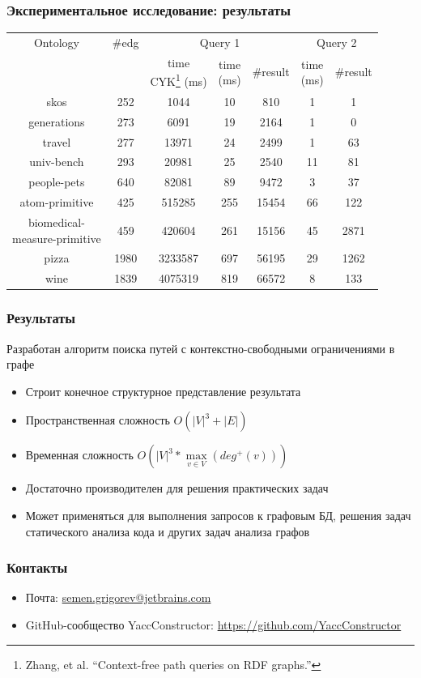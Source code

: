 \documentclass[xcolor=table]{beamer}
\begin{document}
\begin{frame}[fragile]
\transwipe[direction=90]
\frametitle{Экспериментальное исследование: результаты}
\centering
{}
\begin{tabular}{  c | c | c | c | c | c | c }
Ontology & \#edg & \multicolumn{3}{c|}{Query 1} & \multicolumn{2}{c}{Query 2} \\
\cline{3-7}
& & \shortstack{time \\ CYK\footnote{Zhang, et al. ``Context-free path queries on RDF graphs.''} (ms)} & \shortstack{time \\ (ms)} & \#result & \shortstack{time \\ (ms)} & \#result \\
\hline 
\hline
skos        & 252  & 1044  & 10 & 810 & 1 & 1 \\
generations & 273  & 6091  & 19 & 2164 & 1 & 0 \\
travel      & 277  & 13971 & 24 & 2499 & 1 & 63 \\
univ-bench  & 293  & 20981 & 25 & 2540 & 11 & 81 \\
people-pets & 640  & 82081 & 89 & 9472 & 3 & 37 \\
atom-primitive & 425 & 515285 & 255 & 15454 & 66 & 122 \\
\shortstack{biomedical- \\ measure-primitive} & 459 & 420604 & 261 & 15156 & 45 & 2871 \\
pizza       & 1980 & 3233587 & 697 & 56195 & 29 & 1262 \\
wine        & 1839 & 4075319 & 819 & 66572 & 8 & 133 \\
\end{tabular}

\end{frame}

\begin{frame}
  \transwipe[direction=90]
  \frametitle{Результаты}

Разработан алгоритм поиска путей с контекстно-свободными ограничениями в графе
\begin{itemize} 
\item Строит конечное структурное представление результата
\item Пространственная сложность $O(|V|^3 + |E|)$
\item Временная сложность $O\left(|V|^3*\max\limits_{v \in V}\left(deg^+\left(v\right)\right)\right)$
\item Достаточно производителен для решения практических задач
\item Может применяться для выполнения запросов к графовым БД, решения задач статического анализа кода и других задач анализа графов
\end{itemize}

\end{frame}

            
\begin{frame}
\transwipe[direction=90]
\frametitle{Контакты}
\begin{itemize}
  \item Почта: \url{semen.grigorev@jetbrains.com}
  \item GitHub-сообщество YaccConstructor: \url{https://github.com/YaccConstructor}
\end{itemize}
\end{frame}
\end{document}
